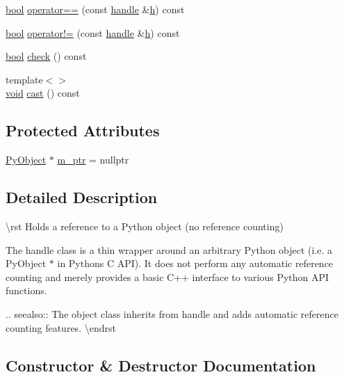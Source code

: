 \begin{DoxyCompactItemize}
\mbox{\hyperlink{asdl_8h_af6a258d8f3ee5206d682d799316314b1}{bool}} \mbox{\hyperlink{classhandle_a7173e778869746c1c7a071e561c79974}{operator==}} (const \mbox{\hyperlink{classhandle}{handle}} \&\mbox{\hyperlink{_s_d_l__opengl__glext_8h_afa0fb1b5e976920c0abeff2dca3ed774}{h}}) const
\item 
\mbox{\hyperlink{asdl_8h_af6a258d8f3ee5206d682d799316314b1}{bool}} \mbox{\hyperlink{classhandle_a71ecf002785a489fbe1db0aa6fb05bc5}{operator!=}} (const \mbox{\hyperlink{classhandle}{handle}} \&\mbox{\hyperlink{_s_d_l__opengl__glext_8h_afa0fb1b5e976920c0abeff2dca3ed774}{h}}) const
\item 
\mbox{\hyperlink{asdl_8h_af6a258d8f3ee5206d682d799316314b1}{bool}} \mbox{\hyperlink{classhandle_a48e44d8de9e6c178fa698fb19efe113d}{check}} () const
\item 
{\footnotesize template$<$$>$ }\\\mbox{\hyperlink{_s_d_l__opengles2__gl2ext_8h_ae5d8fa23ad07c48bb609509eae494c95}{void}} \mbox{\hyperlink{classhandle_aefa5deb13fb8fe6df3ed0f222863ee7e}{cast}} () const
\end{DoxyCompactItemize}
\subsection*{Protected Attributes}
\begin{DoxyCompactItemize}
\item 
\mbox{\hyperlink{_python27_2object_8h_aadc84ac7aed2cfa6f20c25f62bf3dac7}{Py\+Object}} $\ast$ \mbox{\hyperlink{classhandle_a1e9241eea11b47aa15559ccf6fb229f6}{m\+\_\+ptr}} = nullptr
\end{DoxyCompactItemize}


\subsection{Detailed Description}
\textbackslash{}rst Holds a reference to a Python object (no reference counting)

The {\ttfamily handle} class is a thin wrapper around an arbitrary Python object (i.\+e. a {\ttfamily Py\+Object $\ast$} in Python\textquotesingle{}s C A\+PI). It does not perform any automatic reference counting and merely provides a basic C++ interface to various Python A\+PI functions.

.. seealso\+:\+: The {\ttfamily object} class inherits from {\ttfamily handle} and adds automatic reference counting features. \textbackslash{}endrst 

\subsection{Constructor \& Destructor Documentation}
\mbox{\label{classhandle_a53ba30cccfb1cabee421fd4ea555cf44}} 
